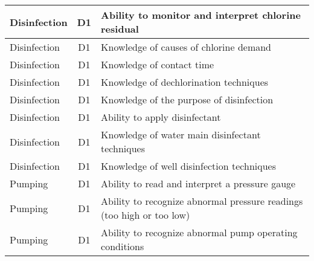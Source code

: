\documentclass{article}
\begin{document}
\begin{table}[]
\begin{tabular}{|l|c|l|}
Disinfection                           & D1             & Ability to monitor   and interpret chlorine residual                                                                              \\ \hline
Disinfection                           & D1             & Knowledge of causes   of chlorine demand                                                                                          \\ \hline
Disinfection                           & D1             & Knowledge of contact   time                                                                                                       \\ \hline
Disinfection                           & D1             & Knowledge of   dechlorination techniques                                                                                          \\ \hline
Disinfection                           & D1             & Knowledge of the   purpose of disinfection                                                                                        \\ \hline
Disinfection                           & D1             & Ability to apply   disinfectant                                                                                                   \\ \hline
Disinfection                           & D1             & Knowledge of water   main disinfectant techniques                                                                                 \\ \hline
Disinfection                           & D1             & Knowledge of well   disinfection techniques                                                                                       \\ \hline
Pumping                                & D1             & Ability to read and   interpret a pressure gauge                                                                                  \\ \hline
Pumping                                & D1             & Ability to recognize   abnormal pressure readings (too high or too low)                                                           \\ \hline
Pumping                                & D1             & Ability to recognize   abnormal pump operating conditions                                                                         \\ \hline

\end{tabular}
\end{table}
\end{document}
